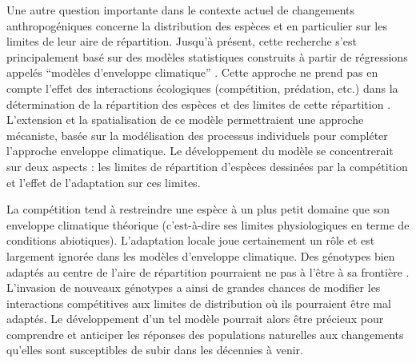 Une autre question importante dans le contexte actuel de changements
anthropogéniques concerne la distribution des espèces et en particulier sur les
limites de leur aire de répartition. Jusqu’à présent, cette recherche s’est
principalement basé sur des modèles statistiques construits à partir de
régressions appelés ``modèles d’enveloppe climatique''
\autocites{parmesan2006a}. Cette approche ne prend pas en compte l’effet des
interactions écologiques (compétition, prédation, etc.) dans la détermination de
la répartition des espèces et des limites de cette répartition
\autocites{lavergne2010a}. L'extension et la spatialisation de ce modèle
permettraient une approche mécaniste, basée sur la modélisation des processus
individuels pour compléter l’approche enveloppe climatique. Le développement
du modèle se concentrerait sur deux aspects : les limites de répartition
d’espèces dessinées par la compétition et l’effet de l’adaptation sur ces
limites. 

La compétition tend à restreindre une espèce à un plus petit domaine que son
enveloppe climatique théorique (c’est-à-dire ses limites physiologiques en terme
de conditions abiotiques). L’adaptation locale joue certainement un rôle et est
largement ignorée dans les modèles d’enveloppe climatique.
Des génotypes bien adaptés au centre de l’aire de répartition pourraient ne pas
à l’être à sa frontière \autocites{kirkpatrick1997a,case2000a}. L’invasion de
nouveaux génotypes a ainsi de grandes chances de modifier les interactions
compétitives aux limites de distribution où ils pourraient être mal adaptés. Le
développement d'un tel modèle pourrait alors être précieux pour comprendre et
anticiper les réponses des populations naturelles aux changements qu'elles sont
susceptibles de subir dans les décennies à venir.

